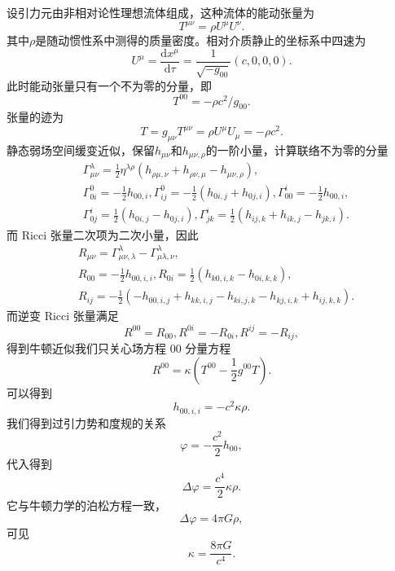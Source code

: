 \documentclass[11pt, a4paper, oneside, onecolumn]{ctexart}
\numberwithin{equation}{subsection}
\begin{document}
设引力元由非相对论性理想流体组成，这种流体的能动张量为
\begin{equation}
T^{\mu\nu}=\rho U^{\mu}U^{\nu}.
\end{equation}
其中$\rho$是随动惯性系中测得的质量密度。相对介质静止的坐标系中四速为
\begin{equation}
U^{\mu}=\frac{\mathrm{d}x^{\mu}}{\mathrm{d}\tau}=\frac{1}{\sqrt{-g_{00}}}\left(c,0,0,0\right).
\end{equation}
此时能动张量只有一个不为零的分量，即
\begin{equation}
T^{00}=-\rho c^{2}/g_{00}.
\end{equation}
张量的迹为
\begin{equation}
T=g_{\mu\nu}T^{\mu\nu}=\rho U^{\mu}U_{\mu}=-\rho c^{2}.
\end{equation}
静态弱场空间缓变近似，保留$h_{\mu\nu}$和$h_{\mu\nu,\rho}$的一阶小量，计算联络不为零的分量
\begin{align}
&\Gamma_{\mu\nu}^{\lambda}=\frac12\eta^{\lambda\rho}\left(h_{\rho\mu,\nu}+h_{\rho\nu,\mu}-h_{\mu\nu,\rho}\right),\\
&\Gamma_{0i}^{0}=-\frac12h_{00,i},\Gamma_{ij}^{0}=-\frac12\left(h_{0i,j}+h_{0j,i}\right),\Gamma_{00}^{i}=-\frac12h_{00,i},\\
&\Gamma_{0j}^{i}=\frac12\left(h_{0i,j}-h_{0j,i}\right),\Gamma_{jk}^{i}=\frac12\left(h_{ij,k}+h_{ik,j}-h_{jk,i}\right).
\end{align}
而 Ricci 张量二次项为二次小量，因此
\begin{align}
&R_{\mu\nu}=\Gamma_{\mu\nu,\lambda}^{\lambda}-\Gamma_{\mu\lambda,\nu}^{\lambda},\\
&R_{00}=-\frac12h_{00,i,i},R_{0i}=\frac12\left(h_{k0,i,k}-h_{0i,k,k}\right),\\
&R_{ij}=-\frac12\left(-h_{00,i,j}+h_{kk,i,j}-h_{ki,j,k}-h_{kj,i,k}+h_{ij,k,k}\right).
\end{align}
而逆变 Ricci 张量满足
\begin{equation}
R^{00}=R_{00},R^{0i}=-R_{0i},R^{ij}=-R_{ij},
\end{equation}
得到牛顿近似我们只关心场方程 00 分量方程
\begin{equation}
R^{00}=\kappa\left(T^{00}-\frac12g^{00}T\right).
\end{equation}
可以得到
\begin{equation}
h_{00,i,i}=-c^{2}\kappa\rho.
\end{equation}
我们得到过引力势和度规的关系
\begin{equation}
\varphi=-\frac{c^{2}}{2}h_{00},
\end{equation}
代入得到
\begin{equation}
\Delta{}\varphi=\frac{c^{4}}{2}\kappa\rho.
\end{equation}
它与牛顿力学的泊松方程一致，
\begin{equation}
\Delta{}\varphi=4\pi G\rho,
\end{equation}
可见
\begin{equation}
\kappa=\frac{8\pi G}{c^{4}}.
\end{equation}
\end{document}
